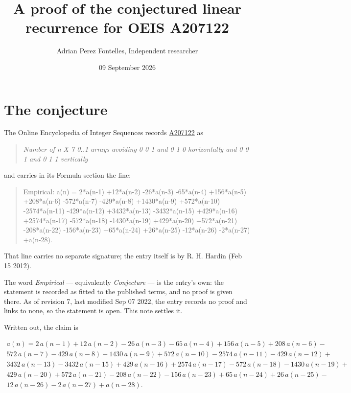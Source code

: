 \documentclass[11pt]{article}
\title{A proof of the conjectured linear recurrence for OEIS A207122}
\author{Adrian Perez Fontelles, Independent researcher}
\date{09 September 2026}
\theoremstyle{definition}
\begin{document}
\maketitle
\section{The conjecture}

The Online Encyclopedia of Integer Sequences records \href{https://oeis.org/A207122}{A207122} as

\begin{quote}\itshape Number of n X 7 0..1 arrays avoiding 0 0 1 and 0 1 0 horizontally and 0 0 1 and 0 1 1 vertically\end{quote}

and carries in its Formula section the line:

\begin{quote}\ttfamily Empirical: a(n) = 2*a(n-1) +12*a(n-2) -26*a(n-3) -65*a(n-4) +156*a(n-5) +208*a(n-6) -572*a(n-7) -429*a(n-8) +1430*a(n-9) +572*a(n-10) -2574*a(n-11) -429*a(n-12) +3432*a(n-13) -3432*a(n-15) +429*a(n-16) +2574*a(n-17) -572*a(n-18) -1430*a(n-19) +429*a(n-20) +572*a(n-21) -208*a(n-22) -156*a(n-23) +65*a(n-24) +26*a(n-25) -12*a(n-26) -2*a(n-27) +a(n-28).\end{quote}

That line carries no separate signature; the entry itself is by R. H. Hardin (Feb 15 2012).

The word {\itshape Empirical} --- equivalently {\itshape Conjecture} --- is the entry's own: the statement is recorded as fitted to the published terms, and no proof is given there. As of revision 7, last modified Sep 07 2022, the entry records no proof and links to none, so the statement is open. This note settles it.

Written out, the claim is

\begin{multline*} a(n) = 2\,a(n-1) + 12\,a(n-2) - 26\,a(n-3) - 65\,a(n-4) + 156\,a(n-5) + 208\,a(n-6) - \\ 572\,a(n-7) - 429\,a(n-8) + 1430\,a(n-9) + 572\,a(n-10) - 2574\,a(n-11) - 429\,a(n-12) + \\ 3432\,a(n-13) - 3432\,a(n-15) + 429\,a(n-16) + 2574\,a(n-17) - 572\,a(n-18) - 1430\,a(n-19) + \\ 429\,a(n-20) + 572\,a(n-21) - 208\,a(n-22) - 156\,a(n-23) + 65\,a(n-24) + 26\,a(n-25) - \\ 12\,a(n-26) - 2\,a(n-27) + a(n-28). \end{multline*}
\end{document}
